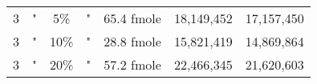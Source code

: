 \begin{table}[htdp]
\begin{center}
\begin{tabular}{|c|c|c|c|c|c|c|}
3 & " & 5\% & " & 65.4 fmole & 18,149,452 &17,157,450 \\
3 & " & 10\% & " & 28.8 fmole & 15,821,419 &14,869,864 \\
3 & " & 20\% & " & 57.2 fmole & 22,466,345 &21,620,603 \\
\hline

\end{tabular}
\label{tab:protocols}
\end{center}
\end{table}
      
